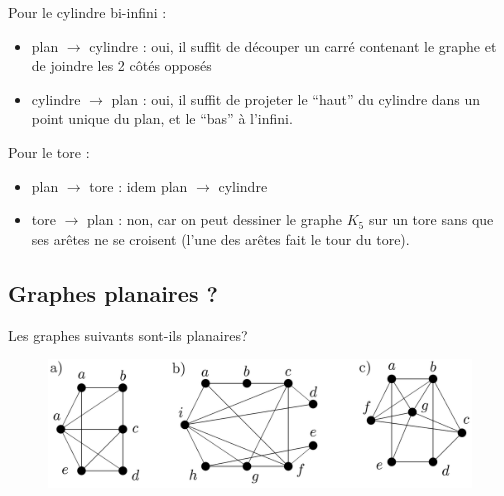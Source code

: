 \begin{solution}
Pour le cylindre bi-infini : 
\begin{itemize}
\item plan $\longrightarrow$ cylindre : oui, il suffit de découper un carré contenant le graphe et de joindre les 2 côtés opposés
\item cylindre $\longrightarrow$ plan : oui, il suffit de projeter le ``haut'' du cylindre dans un point unique du plan, et le ``bas'' à l'infini. \\
\end{itemize}

Pour le tore : 
\begin{itemize}
\item plan $\longrightarrow$ tore : idem plan $\longrightarrow$ cylindre
\item tore $\longrightarrow$ plan : non, car on peut dessiner le graphe $K_5$ sur un tore sans que ses arêtes ne se croisent (l'une des arêtes fait le tour du tore).
\end{itemize}
\end{solution}

\subsection{Graphes planaires ?} Les graphes suivants sont-ils planaires?

\begin{figure}[h!]
  \begin{center}
    \includegraphics[width=15cm]{tp9_2.png}
      \end{center}
\end{figure}

